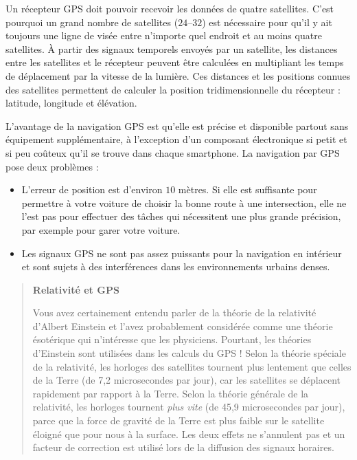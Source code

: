 Un récepteur GPS doit pouvoir recevoir les données de quatre satellites. C'est pourquoi un grand nombre de satellites ($24$--$32$) est nécessaire pour qu'il y ait toujours une ligne de visée entre n'importe quel endroit et au moins quatre satellites. À partir des signaux temporels envoyés par un satellite, les distances entre les satellites et le récepteur peuvent être calculées en multipliant les temps de déplacement par la vitesse de la lumière. Ces distances et les positions connues des satellites permettent de calculer la position tridimensionnelle du récepteur : latitude, longitude et élévation.

L'avantage de la navigation GPS est qu'elle est précise et disponible partout sans équipement supplémentaire, à l'exception d'un composant électronique si petit et si peu coûteux qu'il se trouve dans chaque smartphone. La navigation par GPS pose deux problèmes :
\begin{itemize}
\item L'erreur de position est d'environ $10$ mètres. Si elle est suffisante pour permettre à votre voiture de choisir la bonne route à une intersection, elle ne l'est pas pour effectuer des tâches qui nécessitent une plus grande précision, par exemple pour garer votre voiture.
\item Les signaux GPS ne sont pas assez puissants pour la navigation en intérieur et sont sujets à des interférences dans les environnements urbains denses.
\end{itemize}

\begin{quote}
\begin{center}
\textbf{Relativité et GPS}
\end{center}
Vous avez certainement entendu parler de la théorie de la relativité d'Albert Einstein et l'avez probablement considérée comme une théorie ésotérique qui n'intéresse que les physiciens. Pourtant, les théories d'Einstein sont utilisées dans les calculs du GPS ! Selon la théorie spéciale de la relativité, les horloges des satellites tournent plus lentement que celles de la Terre (de 7,2 microsecondes par jour), car les satellites se déplacent rapidement par rapport à la Terre. Selon la théorie générale de la relativité, les horloges tournent \emph{plus vite} (de 45,9 microsecondes par jour), parce que la force de gravité de la Terre est plus faible sur le satellite éloigné que pour nous à la surface. Les deux effets ne s'annulent pas et un facteur de correction est utilisé lors de la diffusion des signaux horaires.
\end{quote}

